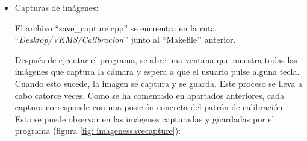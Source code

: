 \begin{itemize}
    \item Capturas de imágenes:
    
    El archivo ``save\_capture.cpp'' se encuentra en la ruta ``{\itshape Desktop/VKMS/Calibracion}’’ junto al ``Makefile’’ anterior. \\
    
    
Después de ejecutar el programa, se abre una ventana que muestra todas las imágenes que captura la cámara y espera a que el usuario pulse alguna tecla. Cuando esto sucede, la imagen se captura y se guarda. Este proceso se lleva a cabo catorce veces. Como se ha comentado en apartados anteriores, cada captura corresponde con una posición concreta del patrón de calibración. Esto se puede observar en las imágenes capturadas y guardadas por el programa (figura \ref{fig: imagenessavecapture}): 
    

\end{itemize}
